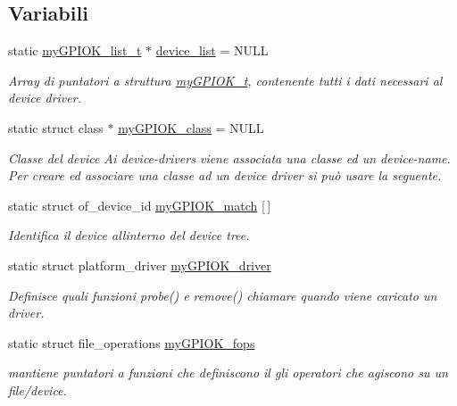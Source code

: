 \subsection*{Variabili}
\begin{DoxyCompactItemize}
\item 
static \hyperlink{structmy_g_p_i_o_k__list__t}{my\+G\+P\+I\+O\+K\+\_\+list\+\_\+t} $\ast$ \hyperlink{group___linux-_driver_ga1deed297d5c8afeb9703965d37d3be5b}{device\+\_\+list} = N\+U\+LL
\begin{DoxyCompactList}\small\item\em Array di puntatori a struttura \hyperlink{structmy_g_p_i_o_k__t}{my\+G\+P\+I\+O\+K\+\_\+t}, contenente tutti i dati necessari al device driver. \end{DoxyCompactList}\item 
static struct class $\ast$ \hyperlink{group___linux-_driver_gaaf8d1bce7d6389684a037e94381c275c}{my\+G\+P\+I\+O\+K\+\_\+class} = N\+U\+LL
\begin{DoxyCompactList}\small\item\em Classe del device Ai device-\/drivers viene associata una classe ed un device-\/name. Per creare ed associare una classe ad un device driver si può usare la seguente. \end{DoxyCompactList}\item 
static struct of\+\_\+device\+\_\+id \hyperlink{group___linux-_driver_gab59f49dc0fe8d885c73752b8a8163d0e}{my\+G\+P\+I\+O\+K\+\_\+match} \mbox{[}$\,$\mbox{]}
\begin{DoxyCompactList}\small\item\em Identifica il device all\textquotesingle{}interno del device tree. \end{DoxyCompactList}\item 
static struct platform\+\_\+driver \hyperlink{group___linux-_driver_ga8dba1541b58fa63f8208232ffce4fc47}{my\+G\+P\+I\+O\+K\+\_\+driver}
\begin{DoxyCompactList}\small\item\em Definisce quali funzioni probe() e remove() chiamare quando viene caricato un driver. \end{DoxyCompactList}\item 
static struct file\+\_\+operations \hyperlink{group___linux-_driver_gad1963bc01fffdbb315a408a9210cbafc}{my\+G\+P\+I\+O\+K\+\_\+fops}
\begin{DoxyCompactList}\small\item\em mantiene puntatori a funzioni che definiscono il gli operatori che agiscono su un file/device. \end{DoxyCompactList}\end{DoxyCompactItemize}


